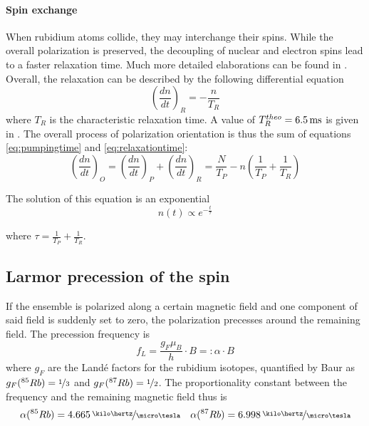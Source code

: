 \paragraph{Spin exchange}
When rubidium atoms collide, they may interchange their spins. While the overall polarization is preserved, the decoupling of nuclear and electron spins lead to a faster relaxation time. Much more detailed elaborations can be found in \cite{happer}.\\

Overall, the relaxation can be described by the following differential equation
\begin{equation}
\left(\frac{dn}{dt}\right)_R=-\frac{n}{T_R}
\label{eq:relaxationtime}
\end{equation}
where $T_R$ is the characteristic relaxation time. A value of $T^{theo}_R=\unit[6.5]{ms}$ is given in \cite{staatsex}. The overall process of polarization orientation is thus the sum of equations \ref{eq:pumpingtime} and \ref{eq:relaxationtime}:
\begin{equation}
\left(\frac{dn}{dt}\right)_O=\left(\frac{dn}{dt}\right)_P+\left(\frac{dn}{dt}\right)_R=\frac{N}{T_P}-n\left(\frac{1}{T_P}+\frac{1}{T_R}\right)
\end{equation}

The solution of this equation is an exponential
\begin{equation}
n(t)\propto e^{-\frac{t}{\tau}}
\label{eq:orientationexponential}
\end{equation}

where $\tau=\frac{1}{T_P}+\frac{1}{T_R}$.

\subsection{Larmor precession of the spin}
If the ensemble is polarized along a certain magnetic field and one component of said field is suddenly set to zero, the polarization precesses around the remaining field. The precession frequency is
\begin{equation}
f_L=\frac{g_F\mu_B}{h}\cdot B =: \alpha\cdot B
\end{equation}
where $g_F$ are the Landé factors for the rubidium isotopes, quantified by Baur \cite{staatsex} as $g_F(^{85}Rb)=\nicefrac{1}{3}$ and $g_F(^{87}Rb)=\nicefrac{1}{2}$. The proportionality constant between the frequency and the remaining magnetic field thus is 
\begin{equation}
\alpha(^{85}Rb)=\unitfrac[4.665]{\kilo\hertz}{\micro\tesla}\quad \alpha(^{87}Rb)=\unitfrac[6.998]{\kilo\hertz}{\micro\tesla}
\end{equation}
\newpage

